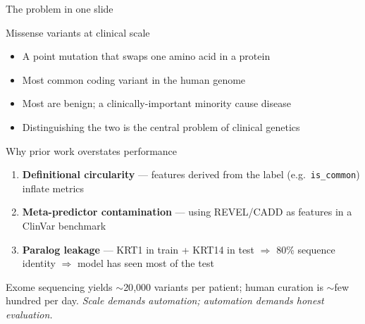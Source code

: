 %
%
%



\begin{frame}{The problem in one slide}
  \begin{block}{Missense variants at clinical scale}
    \begin{itemize}
      \item A point mutation that swaps one amino acid in a protein
      \item Most common coding variant in the human genome
      \item Most are benign; a clinically-important minority cause disease
      \item Distinguishing the two is the central problem of clinical genetics
    \end{itemize}
  \end{block}

  \vspace{0.3em}
  \begin{alertblock}{Why prior work overstates performance}
    \begin{enumerate}
      \item \textbf{Definitional circularity} --- features derived from the label
            (e.g.\ \texttt{is\_common}) inflate metrics
      \item \textbf{Meta-predictor contamination} --- using REVEL/CADD as features
            in a ClinVar benchmark
      \item \textbf{Paralog leakage} --- KRT1 in train + KRT14 in test
            $\Rightarrow$ 80\% sequence identity $\Rightarrow$ model has seen most of the test
    \end{enumerate}
    \vspace{0.4em}
    \footnotesize
    Exome sequencing yields $\sim$20{,}000 variants per patient; human curation
    is $\sim$few hundred per day. \emph{Scale demands automation; automation
    demands honest evaluation.}
  \end{alertblock}
\end{frame}


